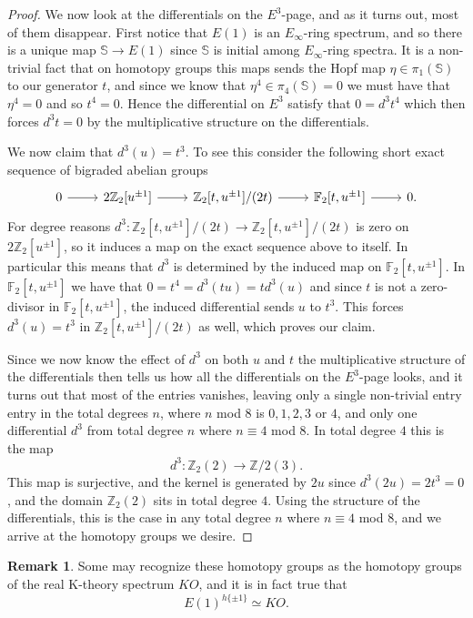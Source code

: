 \documentclass[a4paper]{article} %
\theoremstyle{definition}
\newtheorem{remark}[theorem]{Remark}
\newcommand{\Z}{\mathbb{Z}}
\newcommand{\F}{\mathbb{F}}
\newcommand{\Sph}{\mathbb{S}}
\begin{document}
\begin{proof}
We now look at the differentials on the $E^3$-page, and as it turns out, most of them disappear. First notice that $E(1)$ is an $E_\infty$-ring spectrum, and so there is a unique map $\Sph \to E(1)$ since $\Sph$ is initial among $E_\infty$-ring spectra. It is a non-trivial fact that on homotopy groups this maps sends the Hopf map $\eta \in \pi_1(\Sph)$ to our generator $t$, and since we know that $\eta^4 \in \pi_4(\Sph) = 0$ we must have that $\eta^4 = 0$ and so $t^4 = 0$. Hence the differential on $E^3$ satisfy that $0 = d^3 t^4$
which then forces $d^3t = 0$ by the multiplicative structure on the differentials.

 We now claim that $d^3(u) = t^3$. To see this consider the following short exact sequence of bigraded abelian groups
 \[
\begin{tikzcd}
  0 \rar & 2\Z_2[u^{\pm 1}] \rar & \Z_2[t, u^{\pm 1}]/(2t) \rar & \F_2[t, u^{\pm 1}] \rar & 0.
\end{tikzcd}
 \]
 For degree reasons $d^3 \colon \Z_2[t, u^{\pm 1}]/(2t) \to \Z_2[t, u^{\pm 1}]/(2t)$ is zero on $2\Z_2[u^{\pm 1}]$, so it induces a map on the exact sequence above to itself. In particular this means that $d^3$ is determined by the induced map on $\F_2[t, u^{\pm 1}]$. In $\F_2[t, u^{\pm 1}]$ we have that $0 = t^4 = d^3(tu) = t d^3(u)$ and since
 $t$ is not a zero-divisor in $\F_2[t, u^{\pm 1}]$,
 the induced differential sends $u$ to $t^3$. This forces $d^3(u) = t^3$ in $\Z_2[t, u^{\pm 1}]/(2t)$ as well, which proves our claim.


Since we now know the effect of $d^3$ on both $u$ and $t$ the multiplicative structure of the differentials then tells us how all the differentials on the $E^3$-page looks, and it turns out that most of the entries vanishes, leaving only a single non-trivial entry entry in the total degrees $n$, where $n$ mod $8$ is $0, 1, 2 ,3$ or $4$, and only one differential $d^3$ from total degree $n$ where $n \equiv 4$ mod $8$. In total degree $4$ this is the map
\[
d^3 \colon \Z_2(2) \to \Z/2(3).
\]
This map is surjective, and the kernel is generated by $2u$ since $d^3(2u)=2t^3 = 0$, and the domain $\Z_2(2)$ sits in total degree $4$. Using the structure of the differentials, this is the case in any total degree $n$ where $n \equiv 4$ mod $8$, and we arrive at the homotopy groups we desire.
\end{proof}

\begin{remark}
  Some may recognize these homotopy groups as the homotopy groups of the real K-theory spectrum $KO$, and it is in fact true that
  \[
    E(1)^{h\{ \pm1\}} \simeq KO.
  \]
\end{remark}
\end{document}
